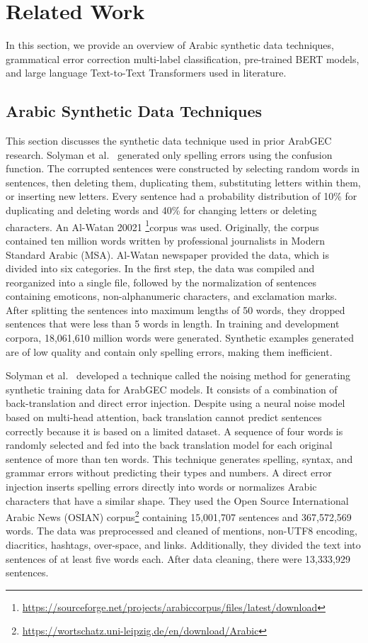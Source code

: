 \section{Related Work}
In this section, we provide an overview of Arabic synthetic data techniques, grammatical error correction multi-label classification, pre-trained BERT models, and large language Text-to-Text Transformers used in literature.

\subsection{Arabic Synthetic Data Techniques}
This section discusses the synthetic data technique used in prior ArabGEC research. Solyman et al.~\cite{solyman2021synthetic} generated only spelling errors using the confusion function. The corrupted sentences were constructed by selecting random words in sentences, then deleting them, duplicating them, substituting letters within them, or inserting new letters. Every sentence had a probability distribution of 10\% for duplicating and deleting words and 40\% for changing letters or deleting characters. An Al-Watan 20021 \footnote{\url{https://sourceforge.net/projects/arabiccorpus/files/latest/download}}corpus was used. Originally, the corpus contained ten million words written by professional journalists in Modern Standard Arabic (MSA). Al-Watan newspaper provided the data, which is divided into six categories. In the first step, the data was compiled and reorganized into a single file, followed by the normalization of sentences containing emoticons, non-alphanumeric characters, and exclamation marks. After splitting the sentences into maximum lengths of 50 words, they dropped sentences that were less than 5 words in length. In training and development corpora, 18,061,610 million words were generated. Synthetic examples generated are of low quality and contain only spelling errors, making them inefficient.

Solyman et al.~\cite{solyman2022automatic}  developed a technique called the noising method for generating synthetic training data for ArabGEC models. It consists of a combination of back-translation and direct error injection. Despite using a neural noise model based on multi-head attention, back translation cannot predict sentences correctly because it is based on a limited dataset. A sequence of four words is randomly selected and fed into the back translation model for each original sentence of more than ten words. This technique generates spelling, syntax, and grammar errors without predicting their types and numbers. A direct error injection inserts spelling errors directly into words or normalizes Arabic characters that have a similar shape. They used the Open Source International Arabic News (OSIAN) corpus\footnote{\url{https://wortschatz.uni-leipzig.de/en/download/Arabic}} containing 15,001,707 sentences and 367,572,569 words. The data was preprocessed and cleaned of mentions, non-UTF8 encoding, diacritics, hashtags, over-space, and links. Additionally, they divided the text into sentences of at least five words each. After data cleaning, there were 13,333,929 sentences.


